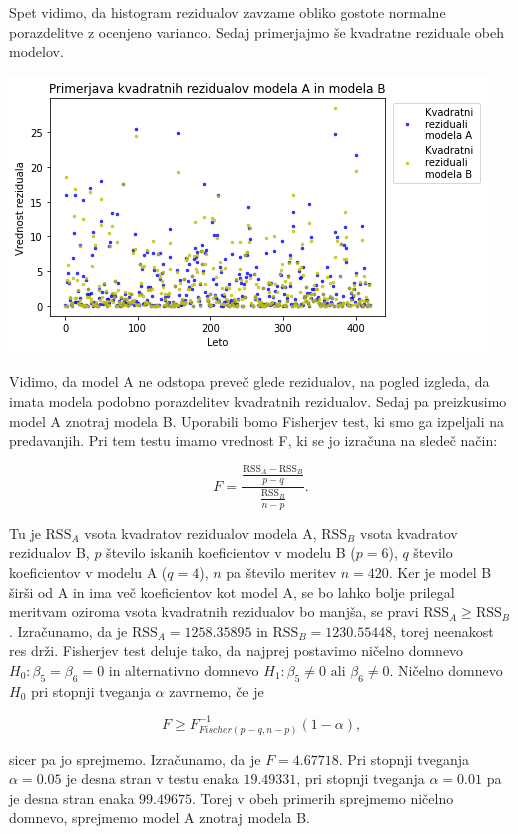 \documentclass[12pt, a4paper]{article}
\begin{document}
Spet vidimo, da histogram rezidualov zavzame obliko gostote normalne porazdelitve 
z ocenjeno varianco. Sedaj primerjajmo še kvadratne reziduale obeh modelov. 

\begin{center}
    \includegraphics[scale=0.5]{Naloga_3_11}
\end{center}

Vidimo, da model A ne odstopa preveč glede rezidualov, na pogled izgleda, da imata 
modela podobno porazdelitev kvadratnih rezidualov. 
Sedaj pa preizkusimo model A znotraj modela B. Uporabili bomo Fisherjev test, ki 
smo ga izpeljali na predavanjih. Pri tem testu imamo vrednost F, ki se jo izračuna 
na sledeč način: 

$$  F = \frac{\frac{\text{RSS}_A - \text{RSS}_B}{p-q}}{\frac{\text{RSS}_B}{n-p}} \text{.}
$$

Tu je $\text{RSS}_A$ vsota kvadratov rezidualov modela A, $\text{RSS}_B$ vsota 
kvadratov rezidualov B, $p$ število iskanih koeficientov v modelu B ($p=6$), 
$q$ število koeficientov v modelu A ($q=4$), $n$ pa število meritev $n=420$. 
Ker je model B širši od A in ima več koeficientov kot model A, se bo lahko bolje 
prilegal meritvam oziroma vsota kvadratnih rezidualov bo manjša, se pravi 
$\text{RSS}_A \geq \text{RSS}_B$. Izračunamo, da je $\text{RSS}_A = 1258.35895$ 
in $\text{RSS}_B = 1230.55448$, torej neenakost res drži. 
Fisherjev test deluje tako, da najprej postavimo ničelno domnevo $H_0 : \beta_5 = 
\beta_6 = 0$ in alternativno domnevo $H_1 : \beta_5 \neq 0 \text{ ali }\beta_6 
\neq 0$. Ničelno domnevo $H_0$ pri stopnji tveganja $\alpha$ zavrnemo, če je

$$ F \geq F^{-1}_{Fischer(p-q, n-p)}(1-\alpha) \text{,}
$$

sicer pa jo sprejmemo. Izračunamo, da je $F = 4.67718$. Pri stopnji tveganja 
$\alpha = 0.05$ je desna stran v testu enaka $19.49331$, pri stopnji tveganja 
$\alpha = 0.01$ pa je desna stran enaka $99.49675$. Torej v obeh primerih 
sprejmemo ničelno domnevo, sprejmemo model A znotraj modela B.
\end{document}
